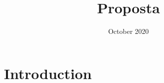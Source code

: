 \documentclass{article}
\title{Proposta}
\date{October 2020}
\begin{document}
\maketitle

\section{Introduction}
\end{document}
